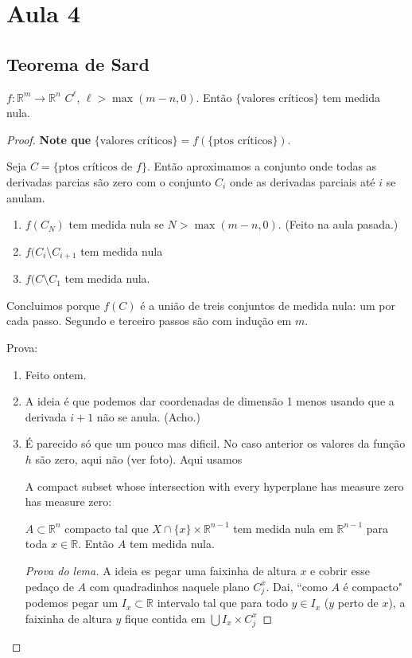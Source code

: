 \section{Aula 4}

\subsection{Teorema de Sard}

\begin{thm}[Sard]\leavevmode
\(f: \mathbb{R}^m \to \mathbb{R}^n\) \(C^\ell\), \(\ell >  \operatorname{max}(m-n,0)\). Então \(\{\text{valores críticos} \}\) tem medida nula.
\end{thm}

\begin{proof}\leavevmode
\textbf{Note que} \(\{\text{valores críticos} \}=f(\{\text{ptos críticos} \})\).

Seja \(C=\{\text{ptos críticos de $f$} \}\). Então aproximamos a conjunto onde todas as derivadas parcias são zero com o conjunto \(C_i\) onde as derivadas parciais até \(i\) se anulam. 
\begin{enumerate}[label=\textbf{Passo \arabic*}]
\item \(f(C_N)\) tem medida nula se \(N>\operatorname{max}(m-n,0)\). {\color{6}(Feito na aula pasada.)}
\item \(f(C_i\setminus C_{i+1}\) tem medida nula
\item \(f(C\setminus C_1\) tem medida nula.
\end{enumerate}
Concluimos porque \(f(C)\) é a união de treis conjuntos de medida nula: um por cada passo. Segundo e terceiro passos são com indução em $m$.

Prova:
\begin{enumerate}[label=\textbf{Passo \arabic*}]
\item Feito ontem.
\item A ideia é que podemos dar coordenadas de dimensão 1 menos usando que a derivada \(i+1\) não se anula. (Acho.)
\item É parecido só que um pouco mas dificil. No caso anterior os valores da função \(h\) são zero, aqui não (ver foto). Aqui usamos
	\begin{lemma}\leavevmode
A compact subset whose intersection with every hyperplane has measure zero has measure zero:

\(A \subset\mathbb{R}^n\) compacto tal que \(X \cap \{ x \}\times \mathbb{R}^{n-1}\) tem medida nula em \(\mathbb{R}^{n-1}\) para toda \(x \in \mathbb{R}\). Então \(A\) tem medida nula.
	\end{lemma}
	\begin{proof}[Prova do lema]\leavevmode
	A ideia es pegar uma faixinha de altura $x$ e cobrir esse pedaço de \(A\) com quadradinhos naquele plano \(C^x_j\). Dai, ``como \(A\) é compacto" podemos pegar um \(I_x \subset \mathbb{R}\) intervalo tal que para todo \(y \in I_x\) ($y$ perto de \(x\)), a faixinha de altura $y$ fique contida em \(\bigcup I_x \times C_j^x\)


\end{proof}
\end{enumerate}
\end{proof}
